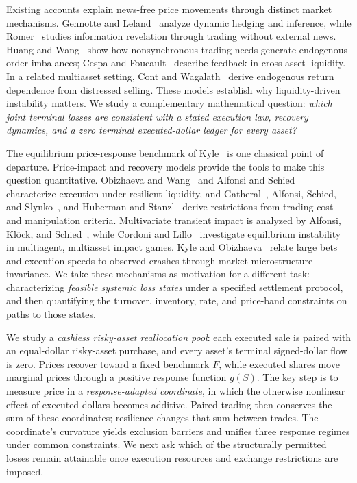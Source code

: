 \documentclass[review,hidelinks,onefignum,onetabnum]{siamonline250211}
\begin{document}
Existing accounts explain news-free price movements through distinct market mechanisms. Gennotte and Leland~\citep{GennotteLeland1990} analyze dynamic hedging and inference, while Romer~\citep{Romer1993} studies information revelation through trading without external news. Huang and Wang~\citep{HuangWang2009} show how nonsynchronous trading needs generate endogenous order imbalances; Cespa and Foucault~\citep{CespaFoucault2014} describe feedback in cross-asset liquidity. In a related multiasset setting, Cont and Wagalath~\citep{ContWagalath2013} derive endogenous return dependence from distressed selling. These models establish why liquidity-driven instability matters. We study a complementary mathematical question: \emph{which joint terminal losses are consistent with a stated execution law, recovery dynamics, and a zero terminal executed-dollar ledger for every asset?}

The equilibrium price-response benchmark of Kyle~\citep{Kyle1985} is one classical point of departure. Price-impact and recovery models provide the tools to make this question quantitative. Obizhaeva and Wang~\citep{ObizhaevaWang2013} and Alfonsi and Schied~\citep{AlfonsiSchied2010} characterize execution under resilient liquidity, and Gatheral~\citep{Gatheral2010}, Alfonsi, Schied, and Slynko~\citep{AlfonsiSchiedSlynko2012}, and Huberman and Stanzl~\citep{HubermanStanzl2004} derive restrictions from trading-cost and manipulation criteria. Multivariate transient impact is analyzed by Alfonsi, Kl\"ock, and Schied~\citep{AlfonsiKlockSchied2016}, while Cordoni and Lillo~\citep{CordoniLillo2024} investigate equilibrium instability in multiagent, multiasset impact games. Kyle and Obizhaeva~\citep{KyleObizhaeva2023} relate large bets and execution speeds to observed crashes through market-microstructure invariance. We take these mechanisms as motivation for a different task: characterizing \emph{feasible systemic loss states} under a specified settlement protocol, and then quantifying the turnover, inventory, rate, and price-band constraints on paths to those states.

We study a \emph{cashless risky-asset reallocation pool}: each executed sale is paired with an equal-dollar risky-asset purchase, and every asset's terminal signed-dollar flow is zero. Prices recover toward a fixed benchmark $F$, while executed shares move marginal prices through a positive response function $g(S)$. The key step is to measure price in a \emph{response-adapted coordinate}, in which the otherwise nonlinear effect of executed dollars becomes additive. Paired trading then conserves the sum of these coordinates; resilience changes that sum between trades. The coordinate's curvature yields exclusion barriers and unifies three response regimes under common constraints. We next ask which of the structurally permitted losses remain attainable once execution resources and exchange restrictions are imposed.
\end{document}
